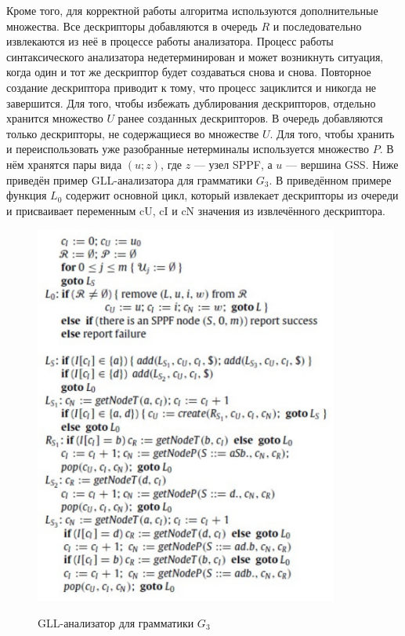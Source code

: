 \documentclass[14pt]{matmex-diploma}
\begin{document}
Кроме того, для корректной работы алгоритма используются дополнительные множества. Все дескрипторы добавляются в очередь $R$ и последовательно извлекаются из неё в процессе работы анализатора. Процесс работы синтаксического анализатора недетерминирован и может возникнуть ситуация, когда один и тот же дескриптор будет создаваться снова и снова. Повторное создание дескриптора приводит к тому, что процесс зациклится и никогда не завершится. Для того, чтобы избежать дублирования дескрипторов, отдельно хранится множество $U$ ранее созданных дескрипторов. В очередь добавляются только дескрипторы, не содержащиеся во множестве $U$. Для того, чтобы хранить и переиспользовать уже разобранные нетерминалы используется множество $P$. В нём хранятся пары вида $(u; z)$, где $z$ --- узел SPPF, а $u$ --- вершина GSS. Ниже приведён пример GLL-анализатора для грамматики $G_3$. В приведённом примере функция $L_0$ содержит основной цикл, который извлекает дескрипторы из очереди и присваивает переменным cU, cI  и cN значения из извлечённого дескриптора. 

\begin{figure}
 \centering
 \includegraphics[width=10cm]{pics/Listing1.pdf}
 \label{ListingGLL1}
 \caption{GLL-анализатор для грамматики $G_3$ }
\end{figure}
\end{document}
